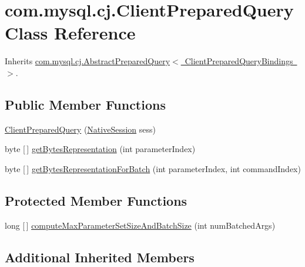 \hypertarget{classcom_1_1mysql_1_1cj_1_1_client_prepared_query}{}\section{com.\+mysql.\+cj.\+Client\+Prepared\+Query Class Reference}
\label{classcom_1_1mysql_1_1cj_1_1_client_prepared_query}


Inherits \mbox{\hyperlink{classcom_1_1mysql_1_1cj_1_1_abstract_prepared_query}{com.\+mysql.\+cj.\+Abstract\+Prepared\+Query$<$ Client\+Prepared\+Query\+Bindings $>$}}.

\subsection*{Public Member Functions}
\begin{DoxyCompactItemize}
\item 
\mbox{\hyperlink{classcom_1_1mysql_1_1cj_1_1_client_prepared_query_a61b8c76c05ef30b155a9b86c302f7876}{Client\+Prepared\+Query}} (\mbox{\hyperlink{classcom_1_1mysql_1_1cj_1_1_native_session}{Native\+Session}} sess)
\item 
byte \mbox{[}$\,$\mbox{]} \mbox{\hyperlink{classcom_1_1mysql_1_1cj_1_1_client_prepared_query_af02746970c69db882201f0613d22084a}{get\+Bytes\+Representation}} (int parameter\+Index)
\item 
byte \mbox{[}$\,$\mbox{]} \mbox{\hyperlink{classcom_1_1mysql_1_1cj_1_1_client_prepared_query_a591dea27c5fc2a48b36978c8c23a92de}{get\+Bytes\+Representation\+For\+Batch}} (int parameter\+Index, int command\+Index)
\end{DoxyCompactItemize}
\subsection*{Protected Member Functions}
\begin{DoxyCompactItemize}
\item 
long \mbox{[}$\,$\mbox{]} \mbox{\hyperlink{classcom_1_1mysql_1_1cj_1_1_client_prepared_query_aa235acebc5003992485e6d8f2b138686}{compute\+Max\+Parameter\+Set\+Size\+And\+Batch\+Size}} (int num\+Batched\+Args)
\end{DoxyCompactItemize}
\subsection*{Additional Inherited Members}


